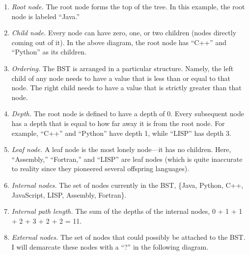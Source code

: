 \documentclass{pset_template}
\begin{document}
\begin{enumerate}
\item \textit{Root node.}
The root node forms the top of the tree.
In this example, the root node is labeled ``Java.''

\item \textit{Child node.}
Every node can have zero, one, or two children (nodes directly coming out
of it).
In the above diagram, the root node has ``C++'' and ``Python'' as its children.

\item \textit{Ordering.}
The BST is arranged in a particular structure.
Namely, the left child of any node needs to have a value that is less than or equal
to that node.
The right child needs to have a value that is strictly greater than that node.

\item \textit{Depth.}
The root node is defined to have a depth of 0.
Every subsequent node has a depth that is equal to how far away it is
from the root node.
For example, ``C++'' and ``Python'' have depth 1, while ``LISP'' has depth 3.

\item \textit{Leaf node.}
A leaf node is the most lonely node---it has no children.
Here, ``Assembly,'' ``Fortran,'' and ``LISP'' are leaf nodes (which is quite
inaccurate to reality since they pioneered several offspring languages).

\item \textit{Internal nodes.}
The set of nodes currently in the BST, \{Java, Python, C++, JavaScript,
LISP, Assembly, Fortran\}.

\item \textit{Internal path length.}
The sum of the depths of the internal nodes, 0 + 1 + 1 + 2 + 3 + 2 + 2 = 11.

\item \textit{External nodes.}
The set of nodes that could possibly be attached to the BST.
I will demarcate these nodes with a ``?'' in the following diagram.
\begin{center}
\end{center}


\end{enumerate}
\end{document}
